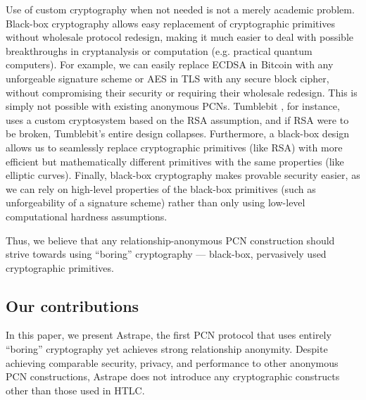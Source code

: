 \documentclass[USenglish,oneside,twocolumn]{article}
\begin{document}
Use of custom cryptography when not needed is not a merely academic problem. Black-box cryptography allows easy replacement of cryptographic primitives without wholesale protocol redesign, making it much easier to deal with possible breakthroughs in cryptanalysis or computation (e.g. practical quantum computers). For example, we can easily replace ECDSA in Bitcoin with any unforgeable signature scheme or AES in TLS with any secure block cipher, without compromising their security or requiring their wholesale redesign. This is simply not possible with existing anonymous PCNs. Tumblebit \cite{heilman2017tumblebit}, for instance, uses a custom cryptosystem based on the RSA assumption, and if RSA were to be broken, Tumblebit's entire design collapses. Furthermore, a black-box design allows us to seamlessly replace cryptographic primitives (like RSA) with more efficient but mathematically different primitives  with the same properties (like elliptic curves). Finally, black-box cryptography makes provable security easier, as we can rely on high-level properties of the black-box primitives (such as unforgeability of a signature scheme) rather than only using low-level computational hardness assumptions.

Thus, we believe that any relationship-anonymous PCN construction should strive towards using ``boring'' cryptography --- black-box, pervasively used cryptographic primitives.

\subsection{Our contributions}

In this paper, we present Astrape, the first PCN protocol that uses entirely ``boring'' cryptography yet achieves strong relationship anonymity. Despite achieving comparable security, privacy, and performance to other anonymous PCN constructions, Astrape does not introduce any cryptographic constructs other than those used in HTLC.
\end{document}
